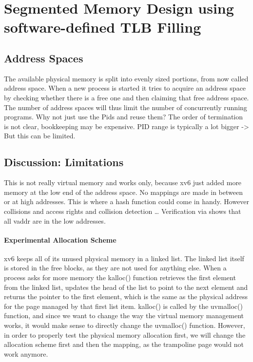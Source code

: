 
\section{Segmented Memory Design using software-defined TLB Filling}
\subsection{Address Spaces}
The available physical memory is split into evenly sized portions, from now called address space.
When a new process is started it tries to acquire an address space by checking whether
there is a free one and then claiming that free address space.
The number of address spaces will thus limit the number of concurrently running programs.
Why not just use the Pids and reuse them? The order of termination is not clear, bookkeeping
may be expensive. PID range is typically a lot bigger -> But this can be limited.
\subsection{Discussion: Limitations}
This is not really virtual memory and works only, because xv6 just added more memory at the low
end of the address space. No mappings are made in between or at high addresses.
This is where a hash function could come in handy. However collisions and access rights and
collision detection \ldots
Verification via %
shows that all vaddr are in the low addresses.







\paragraph*{Experimental Allocation Scheme}
xv6 keeps all of its unused physical memory in a linked list. The linked list itself is stored
in the free blocks, as they are not used for anything else. When a process asks for more memory
the kalloc() function retrieves the first element from the linked list, updates the head
of the list to point to the next element and returns the pointer to the first element,
which is the same as the physical address for the page managed by that first list item.
kalloc() is called by the uvmalloc() function, and since we want to change the way
the virtual memory management works, it would make sense to directly change the uvmalloc() function.
However, in order to properly test the physical memory allocation first, we will change
the allocation scheme first and then the mapping, as the trampoline page would not work anymore.

